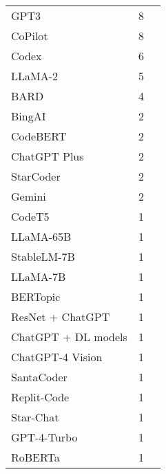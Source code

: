 \begin{table}[!htbp]
\begin{tabular}{@{}l c p{4cm}@{}}
		GPT3 & 8 & \cite{balse2023investigating,cao2023scaffolding,cipriano2023gpt3,cipriano2024llms,li2023potential,liffiton2024codehelp,prakash2024integrating,prather2023robots} \\
		CoPilot & 8 & \cite{arora2024analyzing,bien2024generative,denny2023conversing,lau2023ban,prather2023robots,rasnayaka2024empirical,tanay2024exploratory,venkatesh2023evaluating} \\
		Codex & 6 & \cite{drori2023human,kazemitabaar2023studying,kazemitabaar2024novices,macneil2023experiences,nguyen2024beginning,sarsa2022automatic} \\
		LLaMA-2 & 5 & \cite{oli2024automated,padiyath2024insights,prakash2024integrating,raihan2024cseprompts,xiao2024qacp} \\
		BARD & 4 & \cite{agarwal2024which,cipriano2024llms,dengel2023qualitative,estevezayres2024evaluation} \\
		BingAI & 2 & \cite{arora2024analyzing,kruger2024performance} \\
		CodeBERT & 2 & \cite{oli2024automated,wan2024automated} \\
		ChatGPT Plus & 2 & \cite{padiyath2024insights,rasnayaka2024empirical} \\
		StarCoder & 2 & \cite{babe2023studenteval,raihan2024cseprompts} \\
		Gemini & 2 & \cite{arora2024analyzing,xiao2024qacp} \\
		CodeT5 & 1 & \cite{koutcheme2023training} \\
		LLaMA-65B & 1 & \cite{kruger2024performance} \\
		StableLM-7B & 1 & \cite{kruger2024performance} \\
		LLaMA-7B & 1 & \cite{kruger2024performance} \\
		BERTopic & 1 & \cite{sterbini2024automated} \\
		ResNet + ChatGPT & 1 & \cite{wang2024enhancing} \\
		ChatGPT + DL models & 1 & \cite{hoq2024detecting} \\
		ChatGPT-4 Vision & 1 & \cite{mendoncca2024evaluating} \\
		SantaCoder & 1 & \cite{babe2023studenteval} \\
		Replit-Code & 1 & \cite{babe2023studenteval} \\
		Star-Chat & 1 & \cite{babe2023studenteval} \\
		GPT-4-Turbo & 1 & \cite{oli2024automated} \\
		RoBERTa & 1 & \cite{oli2024automated} \\

\end{tabular}
\end{table}
